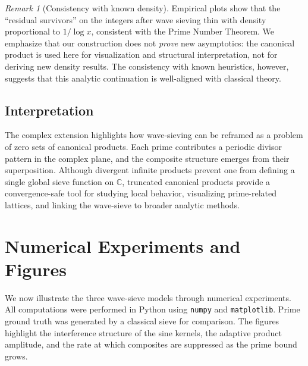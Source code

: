 \documentclass[12pt]{article}
\theoremstyle{definition}
\theoremstyle{remark}
\newtheorem{remark}{Remark}
\newcommand{\C}{\mathbb{C}}
\begin{document}
\begin{remark}[Consistency with known density]
Empirical plots show that the ``residual survivors'' on the integers after wave sieving thin with density proportional to \(1/\log x\), consistent with the Prime Number Theorem. We emphasize that our construction does not \emph{prove} new asymptotics: the canonical product is used here for visualization and structural interpretation, not for deriving new density results. The consistency with known heuristics, however, suggests that this analytic continuation is well-aligned with classical theory.
\end{remark}

\subsection{Interpretation}

The complex extension highlights how wave-sieving can be reframed as a problem of zero sets of canonical products. Each prime contributes a periodic divisor pattern in the complex plane, and the composite structure emerges from their superposition. Although divergent infinite products prevent one from defining a single global sieve function on \(\C\), truncated canonical products provide a convergence-safe tool for studying local behavior, visualizing prime-related lattices, and linking the wave-sieve to broader analytic methods.

\section{Numerical Experiments and Figures}

We now illustrate the three wave-sieve models through numerical experiments. All computations were performed in Python using \texttt{numpy} and \texttt{matplotlib}. Prime ground truth was generated by a classical sieve for comparison. The figures highlight the interference structure of the sine kernels, the adaptive product amplitude, and the rate at which composites are suppressed as the prime bound grows.
\end{document}
